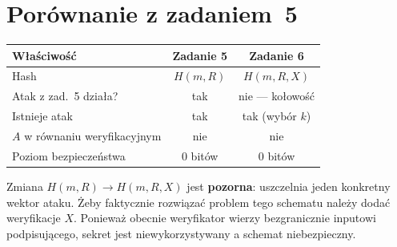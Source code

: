 \documentclass[12pt,a4paper]{article}
\begin{document}
	\section{Porównanie z zadaniem~5}
	
	\begin{center}
		\renewcommand{\arraystretch}{1.4}
		\begin{tabular}{lcc}
			\toprule
			\textbf{Właściwość} & \textbf{Zadanie 5} & \textbf{Zadanie 6} \\
			\midrule
			Hash & $H(m, R)$ & $H(m, R, X)$ \\
			Atak z zad.\ 5 działa? & {\color{correctgreen}tak} & {\color{attackred}nie --- kołowość} \\
			Istnieje atak  & {\color{attackred}tak} & {\color{attackred}tak (wybór $k$)} \\
			$A$ w równaniu weryfikacyjnym & {\color{attackred}nie} & {\color{attackred}nie} \\
			Poziom bezpieczeństwa & 0 bitów & 0 bitów \\
			\bottomrule
		\end{tabular}
	\end{center}
	
	\medskip
	Zmiana $H(m,R) \to H(m,R,X)$ jest \textbf{pozorna}: uszczelnia jeden
	konkretny wektor ataku.  Żeby faktycznie rozwiązać problem tego schematu należy dodać weryfikacje $X$. Ponieważ obecnie weryfikator wierzy bezgranicznie inputowi podpisującego, sekret jest niewykorzystywany a schemat niebezpieczny.
\end{document}
